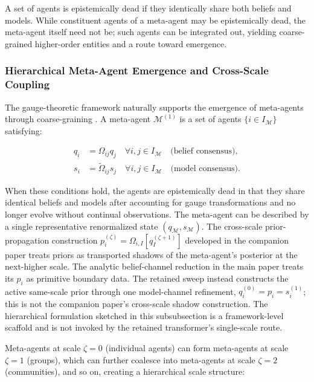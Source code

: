 \documentclass[twoside,11pt]{article}
\begin{document}
A set of agents is epistemically dead if they identically share both beliefs and models. While constituent agents of a meta-agent may be epistemically dead, the meta-agent itself need not be; such agents can be integrated out, yielding coarse-grained higher-order entities and a route toward emergence.

\subsubsection{Hierarchical Meta-Agent Emergence and Cross-Scale Coupling}
\label{sec:appendix_meta_agent}

The gauge-theoretic framework naturally supports the emergence of meta-agents through coarse-graining \citep{kadanoff1966scaling,wilson1974renormalization}. A meta-agent $\mathcal{M}^{(1)}$ is a set of agents $\{i \in I_{\mathcal{M}}\}$ satisfying:

\begin{align}
q_i &= \Omega_{ij} q_j \quad \forall i,j \in I_{\mathcal{M}} \quad \text{(belief consensus)}, \label{eq:belief_consensus} \\
s_i &= \tilde{\Omega}_{ij} s_j \quad \forall i,j \in I_{\mathcal{M}} \quad \text{(model consensus)}. \label{eq:model_consensus}
\end{align}

When these conditions hold, the agents are epistemically dead in that they share identical beliefs and models after accounting for gauge transformations and no longer evolve without continual observations. The meta-agent can be described by a single representative renormalized state $(q_{\mathcal{M}}, s_{\mathcal{M}})$. The cross-scale prior-propagation construction $p_i^{(\zeta)} = \Omega_{i,I}[q_I^{(\zeta+1)}]$ developed in the companion paper \citep{Dennis2025it} treats priors as transported shadows of the meta-agent's posterior at the next-higher scale. The analytic belief-channel reduction in the main paper treats its $p_i$ as primitive boundary data. The retained sweep instead constructs the active same-scale prior through one model-channel refinement, $q_i^{(0)}=p_i=s_i^{(1)}$; this is not the companion paper's cross-scale shadow construction. The hierarchical formulation sketched in this subsubsection is a framework-level scaffold and is not invoked by the retained transformer's single-scale route.

Meta-agents at scale $\zeta=0$ (individual agents) can form meta-agents at scale $\zeta=1$ (groups), which can further coalesce into meta-agents at scale $\zeta=2$ (communities), and so on, creating a hierarchical scale structure:
\end{document}
